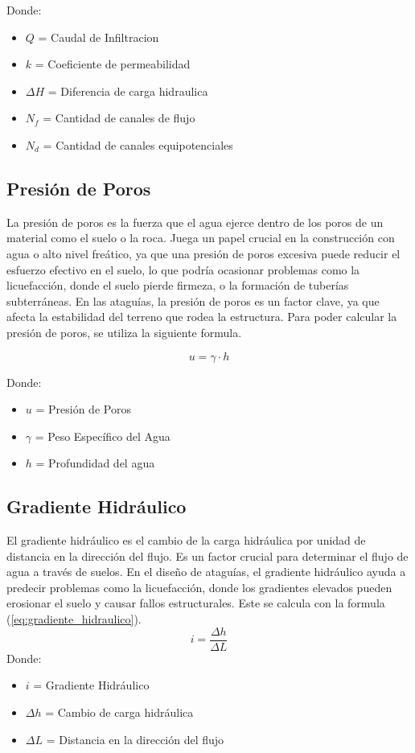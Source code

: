 Donde:
\begin{itemize}
    \item $Q$ = Caudal de Infiltracion
    \item $k$ = Coeficiente de permeabilidad
    \item $\Delta H$ = Diferencia de carga hidraulica
    \item $N_{f}$ = Cantidad de canales de flujo
    \item $N_{d}$ = Cantidad de canales equipotenciales
\end{itemize}

\subsection{Presión de Poros}
La presión de poros es la fuerza que el agua ejerce dentro de los poros de un material como el suelo o la roca. Juega un papel crucial en la construcción con agua o alto nivel freático, ya que una presión de poros excesiva puede reducir el esfuerzo efectivo en el suelo, lo que podría ocasionar problemas como la licuefacción, donde el suelo pierde firmeza, o la formación de tuberías subterráneas. En las ataguías, la presión de poros es un factor clave, ya que afecta la estabilidad del terreno que rodea la estructura. Para poder calcular la presión de poros, se utiliza la siguiente formula. \cite{jeas}

\begin{equation}
    u = \gamma \cdot h
    \label{eq:presion_poros}
\end{equation}

Donde:
\begin{itemize}
    \item $u$ = Presión de Poros
    \item $\gamma$ = Peso Específico del Agua
    \item $h$ = Profundidad del agua
\end{itemize}


\subsection{Gradiente Hidráulico}
El gradiente hidráulico es el cambio de la carga hidráulica por unidad de distancia en la dirección del flujo. Es un factor crucial para determinar el flujo de agua a través de suelos. En el diseño de ataguías, el gradiente hidráulico ayuda a predecir problemas como la licuefacción, donde los gradientes elevados pueden erosionar el suelo y causar fallos estructurales. Este se calcula con la formula (\ref{eq:gradiente_hidraulico}). \cite{budhu_soil_2010}
\begin{equation}
    i = \frac{\Delta h}{\Delta L}
    \label{eq:gradiente_hidraulico}
\end{equation}
Donde:
\begin{itemize}
    \item $i$ = Gradiente Hidráulico
    \item $\Delta h$ = Cambio de carga hidráulica
    \item $\Delta L$ = Distancia en la dirección del flujo
\end{itemize}
